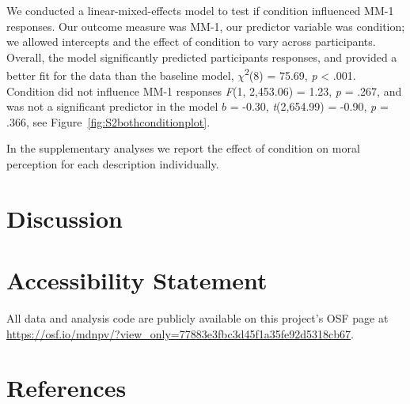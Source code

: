 \documentclass[
  american,
  man,floatsintext]{apa7}
\begin{document}
We conducted a linear-mixed-effects model to test if condition influenced MM-1 responses. Our outcome measure was MM-1, our predictor variable was condition; we allowed intercepts and the effect of condition to vary across participants. Overall, the model significantly predicted participants responses, and provided a better fit for the data than the baseline model, \(\chi\)\textsuperscript{2}(8) = 75.69, \emph{p} \textless{} .001. Condition did not influence MM-1 responses \emph{F}(1, 2,453.06) = 1.23, \emph{p} = .267, and was not a significant predictor in the model \(b\) = -0.30, \emph{t}(2,654.99) = -0.90, \emph{p} = .366, see Figure~\ref{fig:S2bothconditionplot}.

In the supplementary analyses we report the effect of condition on moral perception for each description individually.

\newpage

\hypertarget{discussion}{%
\section{Discussion}\label{discussion}}

\hypertarget{accessibility-statement}{%
\section{Accessibility Statement}\label{accessibility-statement}}

All data and analysis code are publicly available on this project's OSF page at \color{blue}\url{https://osf.io/mdnpv/?view_only=77883e3fbc3d45f1a35fe92d5318cb67}\color{black}.

\newpage

\hypertarget{references}{%
\section*{References}\label{references}}
\end{document}
